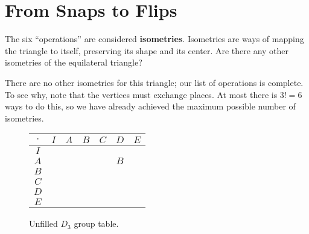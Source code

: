 \documentclass[../gatm_answers.tex]{subfiles}
\begin{document}
\section{From Snaps to Flips}

\begin{outer_problem}[start=1]
\item The six ``operations'' are considered \textbf{isometries}. Isometries are ways of mapping the triangle to itself, preserving its shape and its center. Are there any other isometries of the equilateral triangle?
\end{outer_problem}

\noindent There are no other isometries for this triangle; our list of operations is complete. To see why, note that the vertices must exchange places. At most there is $3!=6$ ways to do this, so we have already achieved the maximum possible number of isometries.

\begin{figure}[h]
	\begin{center}
		\begin{minipage}[b]{\textwidth}
			\centering
			\begin{tabular}{c|cccccc}
				\hline
				$\cdot$ & $I$ & $A$ & $B$ & $C$ & $D$ & $E$ \\ \hline
				\rowcolor{light-gray}
				$I$    &   &   &   &   &   &   \\ 
				$A$    &   &   &   &   & $B$  &   \\ 
				\rowcolor{light-gray}
				$B$    &   &   &   &   &   &   \\ 
				$C$    &   &   &   &   &   &   \\
				\rowcolor{light-gray} 
				$D$    &   &   &   &   &   &   \\ 
				$E$    &   &   &   &   &   &   \\ \hline
			\end{tabular}
			\vspace*{0.5\baselineskip}
		\end{minipage}
	\end{center}
	\vspace*{-2\baselineskip}
	\begin{center}
		\begin{minipage}[t]{\textwidth}
			\caption{Unfilled $D_3$ group table.}
			\label{fig:sbstable}
		\end{minipage}
	\end{center}
	\vspace*{-2\baselineskip}
\end{figure}
\end{document}
